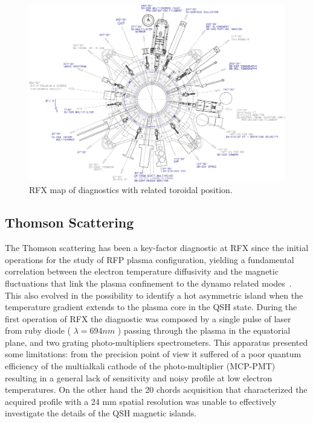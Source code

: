 %
\begin{figure}[ht!]
\includegraphics[width=1\textwidth]{img/rfx/Layout_Diagnosiche_AA10005.eps} \centering
\caption{RFX map of diagnostics with related toroidal position.}
\label{rfx}
\end{figure}
%

\subsection{Thomson Scattering}
The Thomson scattering  has been a key-factor diagnostic at RFX since the initial operations for the study of RFP plasma configuration, yielding a fundamental correlation between the electron temperature diffusivity and the magnetic fluctuations that link the plasma confinement to the dynamo related modes~\cite{}. This also evolved in the possibility to identify a hot asymmetric island when the temperature gradient extends to the plasma core in the \ac{QSH} state.
During the first operation of RFX the diagnostic was composed by a single pulse of laser from ruby diode ( $\lambda = 694 nm$ ) passing through the plasma in the equatorial plane, and two grating photo-multipliers spectrometers.
This apparatus presented some limitations: from the precision point of view it suffered of a poor quantum efficiency of the multialkali cathode of the photo-multiplier (MCP-PMT) resulting in a general lack of sensitivity and noisy profile at low electron temperatures. On the other hand the 20 chords acquisition that characterized the acquired profile with a 24 mm spatial resolution was unable to effectively investigate the details of the QSH magnetic islands.

